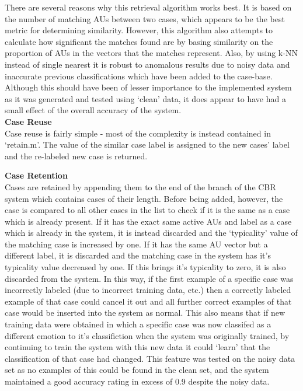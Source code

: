 \documentclass[a4paper]{article}
\begin{document}
There are several reasons why this retrieval algorithm works best. It is based on the number of matching AUs between two cases, which appears to be
the best metric for determining similarity. However, this algorithm also attempts to calculate how significant the matches found are by basing
similarity on the proportion of AUs in the vectors that the matches represent.
Also, by using k-NN instead of single nearest it is robust to anomalous results
due to noisy data and inaccurate previous classifications which have been added to the case-base. Although this should have been of lesser importance
to the implemented system as it was generated and tested using `clean' data, it does appear to have had a small effect of the overall accuracy of the
system.\\

{\bf Case Reuse}\\
Case reuse is fairly simple - most of the complexity is instead contained in `retain.m'. The value of the similar case label is assigned to the new
cases' label and the re-labeled new case is returned.\\

\newpage

{\bf Case Retention}\\
Cases are retained by appending them to the end of the branch of the CBR system which contains cases of their length. Before being added, however,
the case is compared to all other cases in the list to check if it is the same as a case which is already present. If it has the exact same active
AUs and label as a case which is already in the system, it is instead discarded and the `typicality' value of the matching case is increased by one.
If it has the same AU vector but a different label, it is discarded and the matching case in the system has it's typicality value decreased by one. If
this brings it's typicality to zero, it is also discarded from the system. In this way, if the first example of a specific case was incorrectly
labeled (due to incorrect training data, etc.) then a correctly labeled example of that case could cancel it out and all further correct examples
of that case would be inserted into the system as normal. This also means that if new training data were obtained in which a specific case was now
classifed as a different emotion to it's classifiction when the system was originally trained, by continuing to train the system with this new data
it could `learn' that the classification of that case had changed. This feature was tested on the noisy data set as no examples of this could be found
in the clean set, and the system maintained a good accuracy rating in excess of 0.9 despite the noisy data.\\
\end{document}
